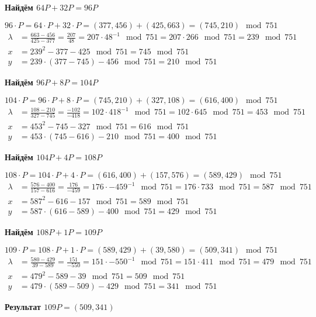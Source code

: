  \textbf{Найдём $64P + 32P = 96P$}

$96 \cdot P = 64 \cdot P + 32 \cdot P = (377, 456) + (425, 663) = (745, 210) \mod 751$
\begin{equation*}
	\begin{aligned}
		\lambda &= \frac{663-456}{425-377} = \frac{207}{48} = 207 \cdot 48^{-1}\mod{751} = 207 \cdot 266\mod{751} = 239\mod{751} \\
		x &= 239^2 - 377 - 425 \mod{751} = 745\mod{751} \\
		y &= 239 \cdot (377 - 745) - 456\mod{751} = 210\mod{751}
	\end{aligned}
\end{equation*}

\textbf{Найдём $96P + 8P = 104P$}

$104 \cdot P = 96 \cdot P + 8 \cdot P = (745, 210) + (327, 108) = (616, 400) \mod 751$
\begin{equation*}
	\begin{aligned}
		\lambda &= \frac{108-210}{327-745} = \frac{-102}{-418} = 102 \cdot 418^{-1}\mod{751} = 102 \cdot 645\mod{751} = 453\mod{751} \\
		x &= 453^2 - 745 - 327 \mod{751} = 616\mod{751} \\
		y &= 453 \cdot (745 - 616) - 210\mod{751} = 400\mod{751}
	\end{aligned}
\end{equation*}

\textbf{Найдём $104P + 4P = 108P$}

$108 \cdot P = 104 \cdot P + 4 \cdot P = (616, 400) + (157, 576) = (589, 429) \mod 751$
\begin{equation*}
	\begin{aligned}
		\lambda &= \frac{576-400}{157-616} = \frac{176}{-459} = 176 \cdot -459^{-1}\mod{751} = 176 \cdot 733\mod{751} = 587\mod{751} \\
		x &= 587^2 - 616 - 157 \mod{751} = 589\mod{751} \\
		y &= 587 \cdot (616 - 589) - 400\mod{751} = 429\mod{751}
	\end{aligned}
\end{equation*}

\textbf{Найдём $108P + 1P = 109P$}

$109 \cdot P = 108 \cdot P + 1 \cdot P = (589, 429) + (39, 580) = (509, 341) \mod 751$
\begin{equation*}
	\begin{aligned}
		\lambda &= \frac{580-429}{39-589} = \frac{151}{-550} = 151 \cdot -550^{-1}\mod{751} = 151 \cdot 411\mod{751} = 479\mod{751} \\
		x &= 479^2 - 589 - 39 \mod{751} = 509\mod{751} \\
		y &= 479 \cdot (589 - 509) - 429\mod{751} = 341\mod{751}
	\end{aligned}
\end{equation*}

\textbf{Результат $109P = (509, 341)$}